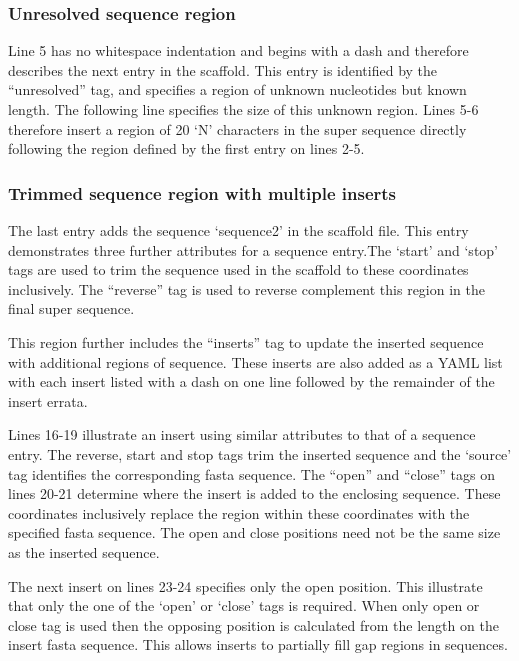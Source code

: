 \documentclass[10pt]{bmc_article}
\newenvironment{bmcformat}{\begin{raggedright}\baselineskip20pt\sloppy\setboolean{publ}{false}}{\end{raggedright}\baselineskip20pt\sloppy}
\begin{document}
\begin{bmcformat}
\subsubsection*{Unresolved sequence region} %

Line 5 has no whitespace indentation and begins with a dash and therefore
describes the next entry in the scaffold. This entry is identified by the
``unresolved'' tag, and specifies a region of unknown nucleotides but known
length. The following line specifies the size of this unknown region. Lines 5-6
therefore insert a region of 20 `N' characters in the super sequence directly
following the region defined by the first entry on lines 2-5. \pb

\subsubsection*{Trimmed sequence region with multiple inserts} %

The last entry adds the sequence `sequence2' in the scaffold file. This entry
demonstrates three further attributes for a sequence entry.The `start' and
`stop' tags are used to trim the sequence used in the scaffold to these
coordinates inclusively. The ``reverse'' tag is used to reverse complement this
region in the final super sequence. \pb

This region further includes the ``inserts'' tag to update the inserted
sequence with additional regions of sequence. These inserts are also added as
a YAML list with each insert listed with a dash on one line followed by the
remainder of the insert errata. \pb

Lines 16-19 illustrate an insert using similar attributes to that of a sequence
entry. The reverse, start and stop tags trim the inserted sequence and the
`source' tag identifies the corresponding fasta sequence. The ``open'' and
``close'' tags on lines 20-21 determine where the insert is added to the
enclosing sequence.  These coordinates inclusively replace the region within
these coordinates with the specified fasta sequence. The open and close
positions need not be the same size as the inserted sequence. \pb

The next insert on lines 23-24 specifies only the open position. This
illustrate that only the one of the `open' or `close' tags is required.  When
only open or close tag is used then the opposing position is calculated from
the length on the insert fasta sequence. This allows inserts to partially fill
gap regions in sequences. \pb


\end{bmcformat}
\end{document}
